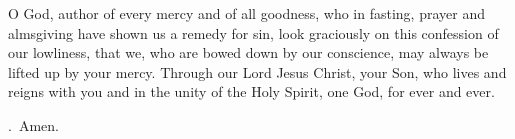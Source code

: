 \lettrine[lines=3]{O}{} God, author of every mercy and of all goodness,
who in fasting, prayer and almsgiving
have shown us a remedy for sin,
look graciously on this confession of our lowliness,
that we, who are bowed down by our conscience,
may always be lifted up by your mercy.
Through our Lord Jesus Christ, your Son,
who lives and reigns with you and in the unity of the Holy Spirit,
one God, for ever and ever.
\par \Rbar.~Amen.
